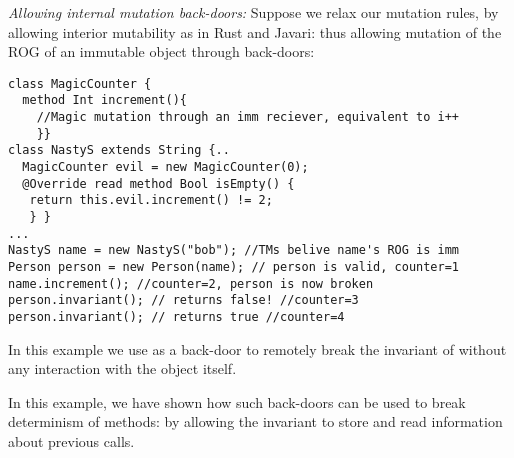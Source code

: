 \loseSpace
\noindent\textit{Allowing internal mutation back-doors:}
Suppose we relax our mutation rules, by allowing interior mutability
as in Rust and Javari: thus allowing mutation of the ROG of an immutable object through back-doors:
\begin{lstlisting}
class MagicCounter {
  method Int increment(){
    //Magic mutation through an imm reciever, equivalent to i++
    }}
class NastyS extends String {..
  MagicCounter evil = new MagicCounter(0);
  @Override read method Bool isEmpty() {
   return this.evil.increment() != 2; 
   } }
...
NastyS name = new NastyS("bob"); //TMs belive name's ROG is imm
Person person = new Person(name); // person is valid, counter=1
name.increment(); //counter=2, person is now broken
person.invariant(); // returns false! //counter=3
person.invariant(); // returns true //counter=4
\end{lstlisting}

In this example we use \Q@MagicCounter@ as a back-door to remotely break the invariant of \Q@person@ without any interaction with the \Q@person@ object itself.

In this example, we have shown how such back-doors can be used to break determinism of  \Q@invariant@ methods: by allowing the invariant to store and read information about previous calls.


